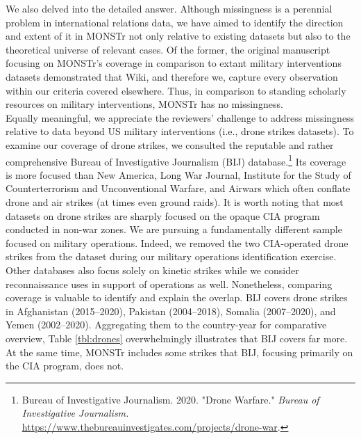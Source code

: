 \documentclass[fleqn,12pt]{article}
\begin{document}
We also delved into the detailed answer. Although missingness is a perennial problem in international relations data, we have aimed to identify the direction and extent of it in MONSTr not only relative to existing datasets but also to the theoretical universe of relevant cases. Of the former, the original manuscript focusing on MONSTr's coverage in comparison to extant military interventions datasets demonstrated that Wiki, and therefore we, capture every observation within our criteria covered elsewhere. Thus, in comparison to standing scholarly resources on military interventions, MONSTr has no missingness. \\

Equally meaningful, we appreciate the reviewers' challenge to address missingness relative to data beyond US military interventions (i.e., drone strikes datasets). To examine our coverage of drone strikes, we consulted the reputable and rather comprehensive Bureau of Investigative Journalism (BIJ) database.\footnote{Bureau of Investigative Journalism. 2020. "Drone Warfare." \textit{Bureau of Investigative Journalism.} \href{https://www.thebureauinvestigates.com/projects/drone-war}{https://www.thebureauinvestigates.com/projects/drone-war}.} Its coverage is more focused than New America, Long War Journal, Institute for the Study of Counterterrorism and Unconventional Warfare, and Airwars which often conflate drone and air strikes (at times even ground raids). It is worth noting that most datasets on drone strikes are sharply focused on the opaque CIA program conducted in non-war zones. We are pursuing a fundamentally different sample focused on military operations. Indeed, we removed the two CIA-operated drone strikes from the dataset during our military operations identification exercise. Other databases also focus solely on kinetic strikes while we consider reconnaissance uses in support of operations as well. Nonetheless, comparing coverage is valuable to identify and explain the overlap. BIJ covers drone strikes in Afghanistan (2015--2020), Pakistan (2004--2018), Somalia (2007--2020), and Yemen (2002--2020). Aggregating them to the country-year for comparative overview, Table \ref{tbl:drones} overwhelmingly illustrates that BIJ covers far more. At the same time, MONSTr includes some strikes that BIJ, focusing primarily on the CIA program, does not. \\
\end{document}
